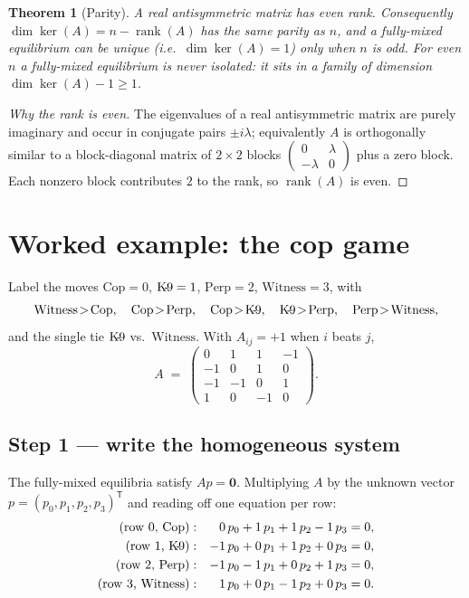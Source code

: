 \documentclass[11pt]{article}
\newcommand{\zero}{\mathbf{0}}
\DeclareMathOperator{\rank}{rank}
\theoremstyle{plain}
\newtheorem{theorem}{Theorem}
\theoremstyle{definition}
\begin{document}
\begin{theorem}[Parity]\label{thm:parity}
A real antisymmetric matrix has even rank. Consequently
$\dim\ker(A) = n-\rank(A)$ has the same parity as $n$, and a fully-mixed
equilibrium can be \emph{unique} (i.e.\ $\dim\ker(A)=1$) only when $n$ is odd. For
even $n$ a fully-mixed equilibrium is never isolated: it sits in a family of
dimension $\dim\ker(A)-1\ge 1$.
\end{theorem}

\begin{proof}[Why the rank is even]
The eigenvalues of a real antisymmetric matrix are purely imaginary and occur in
conjugate pairs $\pm i\lambda$; equivalently $A$ is orthogonally similar to a
block-diagonal matrix of $2\times2$ blocks
$\left(\begin{smallmatrix}0&\lambda\\-\lambda&0\end{smallmatrix}\right)$ plus a zero
block. Each nonzero block contributes $2$ to the rank, so $\rank(A)$ is even.
\end{proof}

\section{Worked example: the cop game}

Label the moves $\text{Cop}=0$, $\text{K\!-\!9}=1$, $\text{Perp}=2$,
$\text{Witness}=3$, with
\[
  \text{Witness}\!>\!\text{Cop},\quad
  \text{Cop}\!>\!\text{Perp},\quad
  \text{Cop}\!>\!\text{K\!-\!9},\quad
  \text{K\!-\!9}\!>\!\text{Perp},\quad
  \text{Perp}\!>\!\text{Witness},
\]
and the single tie $\text{K\!-\!9}$ vs.\ $\text{Witness}$. With $A_{ij}=+1$ when $i$
beats $j$,
\[
  A \;=\;
  \begin{pmatrix}
     0 &  1 &  1 & -1 \\
    -1 &  0 &  1 &  0 \\
    -1 & -1 &  0 &  1 \\
     1 &  0 & -1 &  0
  \end{pmatrix}.
\]

\subsection{Step 1 --- write the homogeneous system}

The fully-mixed equilibria satisfy $Ap=\zero$. Multiplying $A$ by the unknown vector
$p=(p_0,p_1,p_2,p_3)^{\mathsf T}$ and reading off one equation per row:
\[
  \begin{aligned}
    \text{(row $0$, Cop)}    &: & 0\,p_0 + 1\,p_1 + 1\,p_2 - 1\,p_3 &= 0,\\
    \text{(row $1$, K\!-\!9)}&: & -1\,p_0 + 0\,p_1 + 1\,p_2 + 0\,p_3 &= 0,\\
    \text{(row $2$, Perp)}   &: & -1\,p_0 - 1\,p_1 + 0\,p_2 + 1\,p_3 &= 0,\\
    \text{(row $3$, Witness)}&: & 1\,p_0 + 0\,p_1 - 1\,p_2 + 0\,p_3 &= 0.
  \end{aligned}
\]
\end{document}
